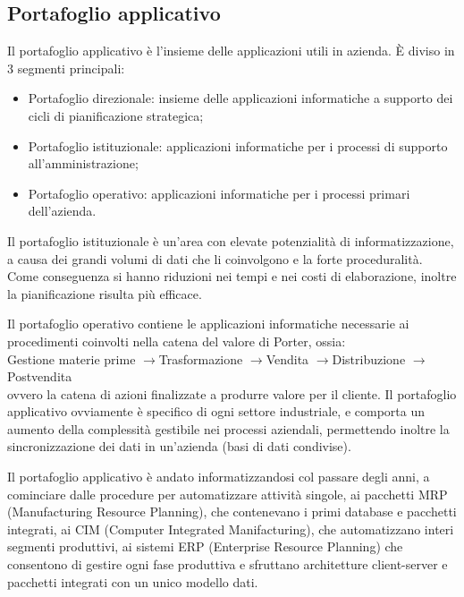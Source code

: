\documentclass[a4paper, 11pt]{article}
\newcommand{\chainto}{$ \to $}
\begin{document}
	\subsection{Portafoglio applicativo}
	Il portafoglio applicativo è l'insieme delle applicazioni utili in azienda. È diviso in 3 segmenti principali: \begin{itemize}
		\item Portafoglio direzionale: insieme delle applicazioni informatiche a supporto dei cicli di pianificazione strategica;
		
		\item Portafoglio istituzionale: applicazioni informatiche per i processi di supporto all’amministrazione;
		
		\item Portafoglio operativo: applicazioni informatiche per i processi primari dell’azienda.
	\end{itemize}

	Il portafoglio istituzionale è un'area con elevate potenzialità di informatizzazione, a causa dei grandi volumi di dati che li coinvolgono e la forte proceduralità. Come conseguenza si hanno riduzioni nei tempi e nei costi di elaborazione, inoltre la pianificazione risulta più efficace.
	
	Il portafoglio operativo contiene le applicazioni informatiche necessarie ai procedimenti coinvolti nella catena del valore di Porter, ossia: \\
	
	Gestione materie prime \chainto Trasformazione \chainto Vendita \chainto Distribuzione \chainto Postvendita \\
	
	ovvero la catena di azioni finalizzate a produrre valore per il cliente. Il portafoglio applicativo ovviamente è specifico di ogni settore industriale, e comporta un aumento della complessità gestibile nei processi aziendali, permettendo inoltre la sincronizzazione dei dati in un'azienda (basi di dati condivise).
	
	Il portafoglio applicativo è andato informatizzandosi col passare degli anni, a cominciare dalle procedure per automatizzare attività singole, ai pacchetti MRP (Manufacturing Resource Planning), che contenevano i primi database e pacchetti integrati, ai CIM (Computer Integrated Manifacturing), che automatizzano interi segmenti produttivi, ai sistemi ERP (Enterprise Resource Planning) che consentono di gestire ogni fase produttiva e sfruttano architetture client-server e pacchetti integrati con un unico modello dati.
	
\end{document}
